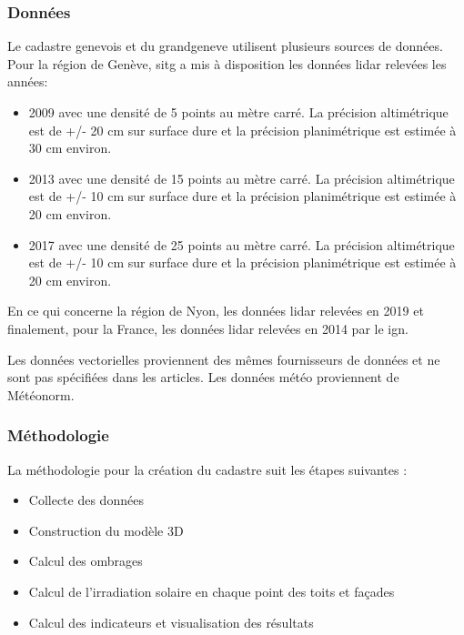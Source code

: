 \subsubsection{Données}
\par{Le cadastre genevois et du \gls{grandgeneve} \cite{desthieux_cadastre_nodate} utilisent plusieurs sources de données. Pour la région de Genève, \acrshort{sitg} a mis à disposition les données \gls{lidar} relevées les années:}
\begin{itemize}
    \item 2009 \cite{sitg_nuages_2009} avec une densité de 5 points au mètre carré. La précision altimétrique est de +/- 20 cm sur surface dure et la précision planimétrique est estimée à 30 cm environ.
    \item 2013 \cite{sitg_nuages_2013} avec une densité de 15 points au mètre carré. La précision altimétrique est de +/- 10 cm sur surface dure et la précision planimétrique est estimée à 20 cm environ.
    \item 2017 \cite{sitg_nuages_2017} avec une densité de 25 points au mètre carré. La précision altimétrique est de +/- 10 cm sur surface dure et la précision planimétrique est estimée à 20 cm environ.
\end{itemize}
\par{En ce qui concerne la région de Nyon, les données \gls{lidar} relevées en 2019 \cite{etat_de_vaud_lidar_nodate} et finalement, pour la France, les données \gls{lidar} relevées en 2014 \cite{ign_ign_nodate} par le \acrshort{ign}.}
\par{Les données vectorielles proviennent des mêmes fournisseurs de données et ne sont pas spécifiées dans les articles. Les données météo proviennent de Météonorm.}


\subsubsection{Méthodologie}

\par{La méthodologie \cite{desthieux_solar_2018} pour la création du cadastre suit les étapes suivantes :}
\begin{itemize}
    \item Collecte des données
    \item Construction du modèle 3D
    \item Calcul des ombrages
    \item Calcul de l'irradiation solaire en chaque point des toits et façades
    \item Calcul des indicateurs et visualisation des résultats
\end{itemize}

